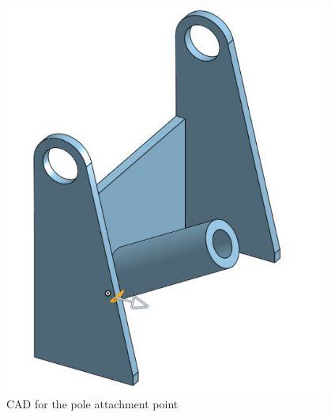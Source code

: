 \begin{figure}[ht]
\begin{minipage}[b]{.48\textwidth}
  \includegraphics[width=0.95\textwidth]{Meetings/November/11-18-21/11-18-21_CAD_Figure2 - Nathan Forrer.JPG}
  \caption{CAD for the pole attachment point}
  \label{fig:pic2}
\end{minipage}
\end{figure}


